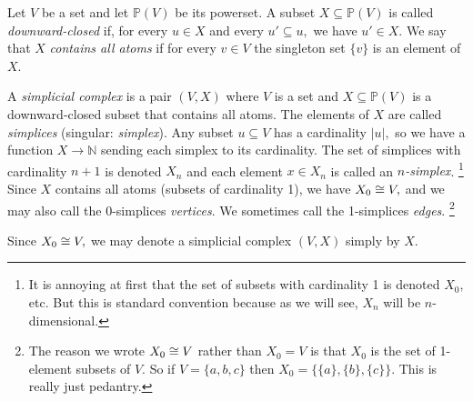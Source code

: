 \documentclass[../main/CT4S-EN-RU]{subfiles}
\begin{document}
\begin{definitionENG}\label{def:simplicial complex}
Let $V$ be a set and let ${ℙ}(V)$ be its powerset. A subset $X\subseteq{ℙ}(V)$ is called {\em downward-closed} if, for every $u\in X$ and every $u'\subseteq u,$ we have $u'\in X.$ We say that $X$ {\em contains all atoms} if for every $v\in V$ the singleton set $\{v\}$ is an element of $X.$ 

A {\em simplicial complex} is a pair $(V,X)$ where $V$ is a set and $X\subseteq{ℙ}(V)$ is a downward-closed subset that contains all atoms. The elements of $X$ are called {\em simplices} (singular: {\em simplex}). Any subset $u\subseteq V$ has a cardinality $|u|,$ so we have a function $X{→}{ℕ}$ sending each simplex to its cardinality. The set of simplices with cardinality $n+1$ is denoted $X_n$ and each element $x\in X_n$ is called an {\em $n$-simplex}.%
\footnote{It is annoying at first that the set of subsets with cardinality 1 is denoted $X_0,$ etc. But this is standard convention because as we will see, $X_n$ will be $n$-dimensional.}
Since $X$ contains all atoms (subsets of cardinality 1), we have $X_0\cong V,$ and we may also call the 0-simplices {\em vertices}. We sometimes call the 1-simplices {\em edges}.%
\footnote{The reason we wrote $X_0\cong V$ rather than $X_0=V$ is that $X_0$ is the set of 1-element subsets of $V.$ So if $V=\{a,b,c\}$ then $X_0=\{\{a\},\{b\},\{c\}\}.$ This is really just pedantry.}

Since $X_0\cong V,$ we may denote a simplicial complex $(V,X)$ simply by $X.$
\end{definitionENG}
\end{document}
